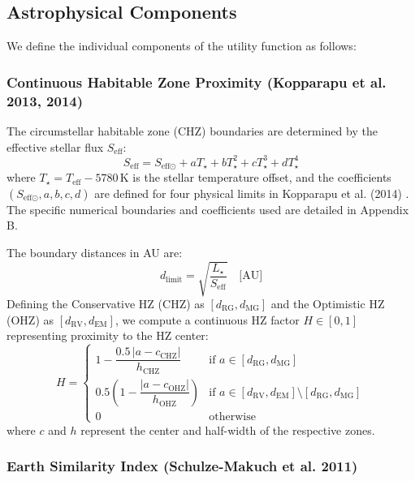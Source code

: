 \documentclass[11pt,a4paper]{article}
\begin{document}
\subsection{Astrophysical Components}

We define the individual components of the utility function as follows:

\subsubsection{Continuous Habitable Zone Proximity (Kopparapu et al. 2013, 2014)}

The circumstellar habitable zone (CHZ) boundaries are determined by the effective stellar flux $S_{\text{eff}}$:
\begin{equation}
S_{\text{eff}} = S_{\text{eff}\odot} + a T_\star + b T_\star^2 + c T_\star^3 + d T_\star^4
\label{eq:seff}
\end{equation}
where $T_\star = T_{\text{eff}} - 5780\,\text{K}$ is the stellar temperature offset, and the coefficients $(S_{\text{eff}\odot}, a, b, c, d)$ are defined for four physical limits in Kopparapu et al. (2014) \cite{kopparapu2014}. The specific numerical boundaries and coefficients used are detailed in Appendix B.

The boundary distances in AU are:
\begin{equation}
d_{\text{limit}} = \sqrt{\frac{L_\star}{S_{\text{eff}}}} \quad \text{[AU]}
\label{eq:hz_dist}
\end{equation}
Defining the Conservative HZ (CHZ) as $[d_{\text{RG}}, d_{\text{MG}}]$ and the Optimistic HZ (OHZ) as $[d_{\text{RV}}, d_{\text{EM}}]$, we compute a continuous HZ factor $H \in [0,1]$ representing proximity to the HZ center:
\begin{equation}
H = \begin{cases}
1 - \dfrac{0.5\,|a - c_{\text{CHZ}}|}{h_{\text{CHZ}}} & \text{if } a \in [d_{\text{RG}}, d_{\text{MG}}] \\[8pt]
0.5\left(1 - \dfrac{|a - c_{\text{OHZ}}|}{h_{\text{OHZ}}}\right) & \text{if } a \in [d_{\text{RV}}, d_{\text{EM}}] \setminus [d_{\text{RG}}, d_{\text{MG}}] \\[8pt]
0 & \text{otherwise}
\end{cases}
\label{eq:hz_factor}
\end{equation}
where $c$ and $h$ represent the center and half-width of the respective zones.

\subsubsection{Earth Similarity Index (Schulze-Makuch et al. 2011)}
\end{document}

